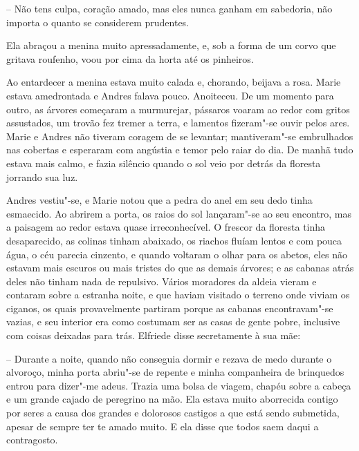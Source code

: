 -- Não tens culpa, coração amado, mas eles nunca ganham em
sabedoria, não importa o quanto se considerem prudentes.

Ela abraçou a menina muito apressadamente, e, sob a forma de um corvo que
gritava roufenho, voou por cima da horta até os pinheiros.
 
Ao entardecer a menina estava muito calada e, chorando, beijava a rosa.
Marie estava amedrontada e Andres falava pouco. Anoiteceu. De um
momento para outro, as árvores começaram a murmurejar, pássaros voaram
ao redor com gritos assustados, um trovão fez tremer a terra, e
lamentos fizeram"-se ouvir pelos ares. Marie e Andres não tiveram
coragem de se levantar; mantiveram"-se embrulhados nas cobertas e
esperaram com angústia e temor pelo raiar do dia. De manhã tudo estava
mais calmo, e fazia silêncio quando o sol veio por detrás da floresta
jorrando sua luz.

Andres vestiu"-se, e Marie notou que a pedra do anel em seu dedo tinha
esmaecido. Ao abrirem a porta, os raios do sol lançaram"-se ao seu
encontro, mas a paisagem ao redor estava quase irreconhecível. O
frescor da floresta tinha desaparecido, as colinas tinham abaixado, os
riachos fluíam lentos e com pouca água, o céu parecia cinzento, e
quando voltaram o olhar para os abetos, eles não estavam mais escuros
ou mais tristes do que as demais árvores; e as cabanas atrás deles não
tinham nada de repulsivo. Vários moradores da aldeia vieram e contaram
sobre a estranha noite, e que haviam visitado o terreno onde viviam os
ciganos, os quais provavelmente partiram porque as cabanas
encontravam"-se vazias, e seu interior era como costumam ser as casas de
gente pobre, inclusive com coisas deixadas para trás. Elfriede disse
secretamente à sua mãe:

-- Durante a noite, quando não conseguia dormir e rezava de medo
durante o alvoroço, minha porta abriu"-se de repente e minha companheira
de brinquedos entrou para dizer"-me adeus. Trazia uma bolsa de viagem,
chapéu sobre a cabeça e um grande cajado de peregrino na mão. Ela
estava muito aborrecida contigo por seres a causa dos grandes e
dolorosos castigos a que está sendo submetida, apesar de sempre ter te
amado muito. E ela disse que todos saem daqui a contragosto.

